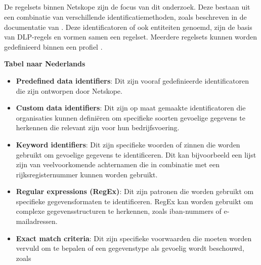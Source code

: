 \subsection{}
\label{subsec:regelsets-literatuurstudie}

De regelsets binnen Netskope zijn de focus van dit onderzoek. Deze bestaan uit een combinatie van verschillende identificatiemethoden, zoals beschreven in de documentatie van \textcite{Netskope2025DLP}. 
Deze identificatoren of ook entiteiten genoemd, zijn de basis van DLP-regels en vormen samen een regelset. 
Meerdere regelsets kunnen worden gedefinieerd binnen een profiel \autocite{Netskope2025Profiles}.



\textbf{Tabel naar Nederlands}

{\small
\begin{itemize}
    \item \textbf{Predefined data identifiers}: Dit zijn vooraf gedefinieerde identificatoren die zijn ontworpen door Netskope.
    \item \textbf{Custom data identifiers}: Dit zijn op maat gemaakte identificatoren die organisaties kunnen definiëren om specifieke soorten gevoelige gegevens te herkennen die relevant zijn voor hun bedrijfsvoering.
    \item \textbf{Keyword identifiers}: Dit zijn specifieke woorden of zinnen die worden gebruikt om gevoelige gegevens te identificeren. Dit kan bijvoorbeeld een lijst zijn van veelvoorkomende achternamen die in combinatie met een rijksregisternummer kunnen worden gebruikt.
    \item \textbf{Regular expressions (RegEx)}: Dit zijn patronen die worden gebruikt om specifieke gegevensformaten te identificeren. RegEx kan worden gebruikt om complexe gegevensstructuren te herkennen, zoals \gls{iban}-nummers of e-mailadressen.
    \item \textbf{Exact match criteria}: Dit zijn specifieke voorwaarden die moeten worden vervuld om te bepalen of een gegevenstype als gevoelig wordt beschouwd, zoals 
\end{itemize}
}


